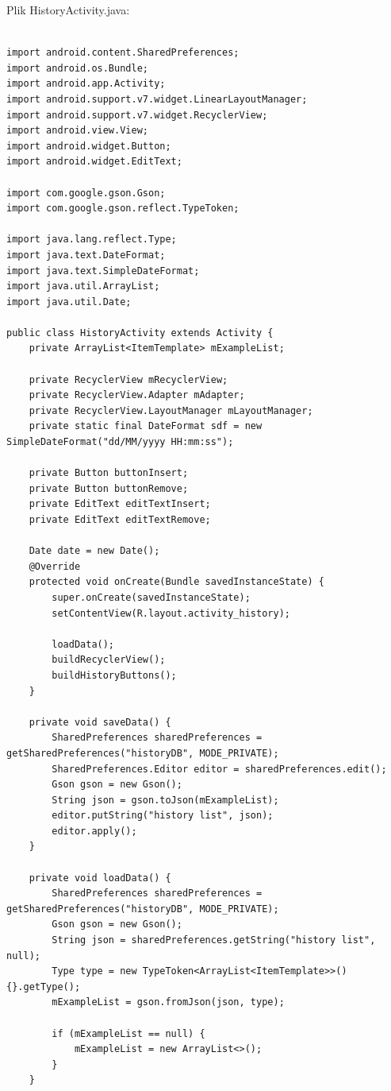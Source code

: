 \documentclass[a4paper]{article}
\begin{document}
Plik HistoryActivity.java:
\begin{lstlisting}[style=java]

import android.content.SharedPreferences;
import android.os.Bundle;
import android.app.Activity;
import android.support.v7.widget.LinearLayoutManager;
import android.support.v7.widget.RecyclerView;
import android.view.View;
import android.widget.Button;
import android.widget.EditText;

import com.google.gson.Gson;
import com.google.gson.reflect.TypeToken;

import java.lang.reflect.Type;
import java.text.DateFormat;
import java.text.SimpleDateFormat;
import java.util.ArrayList;
import java.util.Date;

public class HistoryActivity extends Activity {
    private ArrayList<ItemTemplate> mExampleList;

    private RecyclerView mRecyclerView;
    private RecyclerView.Adapter mAdapter;
    private RecyclerView.LayoutManager mLayoutManager;
    private static final DateFormat sdf = new SimpleDateFormat("dd/MM/yyyy HH:mm:ss");

    private Button buttonInsert;
    private Button buttonRemove;
    private EditText editTextInsert;
    private EditText editTextRemove;

    Date date = new Date();
    @Override
    protected void onCreate(Bundle savedInstanceState) {
        super.onCreate(savedInstanceState);
        setContentView(R.layout.activity_history);

        loadData();
        buildRecyclerView();
        buildHistoryButtons();
    }

    private void saveData() {
        SharedPreferences sharedPreferences = getSharedPreferences("historyDB", MODE_PRIVATE);
        SharedPreferences.Editor editor = sharedPreferences.edit();
        Gson gson = new Gson();
        String json = gson.toJson(mExampleList);
        editor.putString("history list", json);
        editor.apply();
    }

    private void loadData() {
        SharedPreferences sharedPreferences = getSharedPreferences("historyDB", MODE_PRIVATE);
        Gson gson = new Gson();
        String json = sharedPreferences.getString("history list", null);
        Type type = new TypeToken<ArrayList<ItemTemplate>>() {}.getType();
        mExampleList = gson.fromJson(json, type);

        if (mExampleList == null) {
            mExampleList = new ArrayList<>();
        }
    }


\end{lstlisting}
\end{document}
